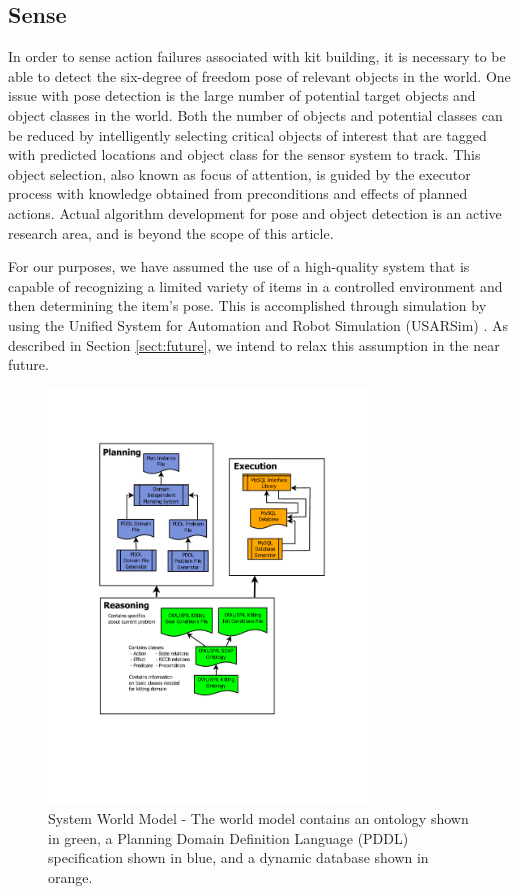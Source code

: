 \documentclass{llncs}
\begin{document}
\subsection{Sense}
\label{subsection:Sense}
In order to sense action failures associated with kit building, it is necessary to be able to detect the six-degree of freedom pose of relevant objects in the
world. One issue with pose detection is the large number of potential target objects and object classes in the world. 
Both the number of objects and potential classes can be reduced by intelligently
selecting critical objects of interest that are tagged with predicted locations and object class for the sensor system to track. This object selection, 
also known as focus of attention, is guided by
the executor process with knowledge obtained from preconditions and effects of planned actions.
Actual algorithm development for pose and object detection is an active research area, and is beyond the scope of this article. 

For our purposes, 
we have assumed the use of a high-quality
system that is capable of recognizing a limited variety of items in a controlled environment and then determining the item's pose. This is accomplished through
simulation by using the Unified System for Automation and Robot Simulation (USARSim) \cite{Balakirsky2007}. As described in Section \ref{sect:future}, 
we intend to relax this assumption in the near future.
%
\begin{figure}[htb!]
\begin{center}
\includegraphics[width=8.5cm]{images/RITAWorldModel.pdf}
\caption{System World Model - The world model contains an ontology shown in green,
a Planning Domain Definition Language (PDDL) specification shown in blue, and a dynamic database shown in orange.}
\label{fig:WorldModel}
\end{center}
\end{figure}
%
\end{document}

